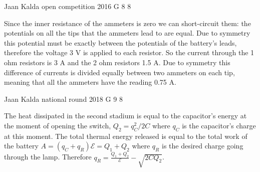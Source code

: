 \documentclass[11pt]{article}
\begin{document}
{Jaan Kalda} %
{open competition} %
{2016} %
{G 8} %
{8} %
{

\ifEngSolution
Since the inner resistance of the ammeters is zero we can short-circuit them: the potentials on all the tips that the ammeters lead to are equal. Due to symmetry this potential must be exactly between the potentials of the battery’s leads, therefore the voltage 3 V is applied to each resistor. So the current through the 1 ohm resistors is 3 A and the 2 ohm resistors 1.5 A. Due to symmetry this difference of currents is divided equally between two ammeters on each tip, meaning that all the ammeters have the reading 0.75 A.
\fi
}

{Jaan Kalda} %
{national round} %
{2018} %
{G 9} %
{8} %
{

\ifEngSolution
The heat dissipated in the second stadium is equal to the capacitor’s energy at the moment of opening the switch, $Q_2=q_C^2/2C$ where $q_C$ is the capacitor’s charge at this moment. The total thermal energy released is equal to the total work of the battery $A=(q_C+q_R)\mathcal E=Q_1+Q_2$ where $q_R$ is the desired charge going through the lamp. Therefore $q_R=\frac{Q_1+Q_2}{\mathcal E}-\sqrt{2CQ_2}$.
\fi
}
\end{document}
